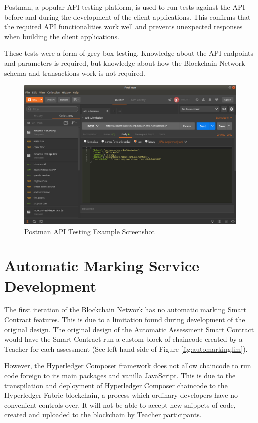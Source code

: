 Postman, a popular API testing platform, is used to run tests against the API 
before and during the development of the client applications. 
This confirms that the required API functionalities work well and 
prevents unexpected responses when building the client applications.

These tests were a form of grey-box testing. Knowledge about the API endpoints 
and parameters is required, but knowledge about how the Blockchain Network schema
and transactions work is not required. 

\clearpage
\begin{figure}[!ht]
	\centering
	\includegraphics[width=1.0\textwidth]{postman}
	\caption[Postman API Testing Example Screenshot]
	{Postman API Testing Example Screenshot}
	\label{fig:postman}
\end{figure}

\section{Automatic Marking Service Development}

The first iteration of the Blockchain Network has no automatic marking Smart Contract features.
This is due to a limitation found during development of the original design. The original design
of the Automatic Assessment Smart Contract would have the Smart Contract run a custom block of chaincode
created by a Teacher for each assessment (See left-hand side of Figure \ref{fig:automarkinglim}).

However, the Hyperledger Composer framework does not allow chaincode to run code foreign to its main packages and vanilla JavaScript.
This is due to the transpilation and deployment of Hyperledger Composer chaincode to the Hyperledger Fabric blockchain,
a process which ordinary developers have no convenient controls over. It will not be able to accept new snippets of code,
created and uploaded to the blockchain by Teacher participants.

